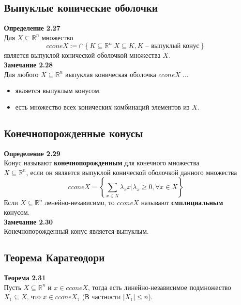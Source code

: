 \subsection{Выпуклые конические оболочки}
\noindent\textbf{Определение 2.27}\\
Для $X \subseteq \mathbb{R}^{n}$ множество
\begin{equation*}
cconeX:=\cap \left\lbrace K \subseteq \mathbb{R}^{n} | X \subseteq K, K \text{ -- выпуклый конус} \right\rbrace
\end{equation*}
является выпуклой конической оболочкой множества $X$.\\

\noindent\textbf{Замечание 2.28}\\
Для любого $X \subseteq \mathbb{R}^{n}$ выпуклая коническая оболочка $ccone X$ ...
\begin{itemize}
\item является выпуклым конусом.
\item есть множество всех конических комбинаций элементов из $X$.
\end{itemize}
\subsection{Конечнопорожденные конусы}
\noindent\textbf{Определение 2.29}\\
Конус называют \textbf{конечнопорожденным} для конечного множества \\
$X \subseteq \mathbb{R}^{n}$, если он является выпуклой конической оболочкой данного множества
\begin{equation*}
cconeX=\left\lbrace \sum_{x\in X} \lambda_{x} x |\lambda_{x}\geq 0, \forall x\in X \right\rbrace
\end{equation*}
Если $X \subseteq \mathbb{R}^{n}$ ленейно-независимо, то $cconeX$ называют \textbf{смплициальным} конусом.\\

\noindent\textbf{Замечание 2.30}\\
Конечнопорожденный конус является выпуклым.
\subsection{Теорема Каратеодори}
\noindent\textbf{Теорема 2.31}\\
Пусть $X \subseteq \mathbb{R}^{n}$ и $x \in cconeX$, тогда есть линейно-независимое подмножество $X_{1} \subseteq X$, что $x\in cconeX_{1}$ (В частности $|X_{1}|\leq n$).\\


